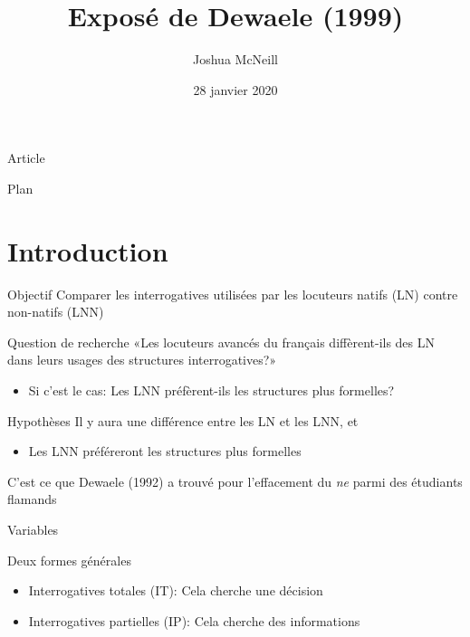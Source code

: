\documentclass{beamer}
\author{Joshua McNeill}
\date{28 janvier 2020}
\title{Exposé de Dewaele (1999)}
\begin{document}
  \begin{frame}
    \titlepage
  \end{frame}

  \begin{frame}{Article}
  \end{frame}

  \begin{frame}{Plan}
    \tableofcontents
  \end{frame}


  \section{Introduction}
    \begin{frame}
      \begin{block}{Objectif}
        Comparer les interrogatives utilisées par les locuteurs natifs (LN) contre non-natifs (LNN)
      \end{block}
      \begin{block}{Question de recherche}
        «Les locuteurs avancés du français diffèrent-ils des LN dans leurs usages des structures interrogatives?»
        \begin{itemize}
          \item Si c'est le cas: Les LNN préfèrent-ils les structures plus formelles?
        \end{itemize}
      \end{block}
    \end{frame}

    \begin{frame}
      \begin{block}{Hypothèses}
        Il y aura une différence entre les LN et les LNN, et
        \begin{itemize}
          \item Les LNN préféreront les structures plus formelles
        \end{itemize}
        C'est ce que Dewaele (1992) a trouvé pour l'effacement du \emph{ne} parmi des étudiants flamands
      \end{block}
    \end{frame}

    \begin{frame}{Variables}
      \begin{block}{Deux formes générales}
        \begin{itemize}
          \item Interrogatives totales (IT): Cela cherche une décision
          \item Interrogatives partielles (IP): Cela cherche des informations
        \end{itemize}
      \end{block}
    \end{frame}
\end{document}
